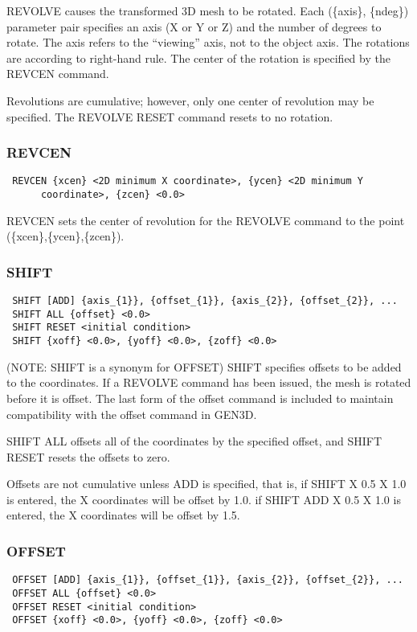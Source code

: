 REVOLVE causes the transformed 3D mesh to be rotated.  Each (\{axis\},
\{ndeg\}) parameter pair specifies an axis (X or Y or Z) and the number of
degrees to rotate.  The axis refers to the ``viewing'' axis, not to the
object axis.  The rotations are according to right-hand rule.  The
center of the rotation is specified by the REVCEN command.

Revolutions are cumulative; however, only one center of revolution may
be specified.  The REVOLVE RESET command resets to no rotation.
\subsubsection{REVCEN}
\begin{verbatim}
 REVCEN {xcen} <2D minimum X coordinate>, {ycen} <2D minimum Y
      coordinate>, {zcen} <0.0>
\end{verbatim}

REVCEN sets the center of revolution for the REVOLVE command to the
point (\{xcen\},\{ycen\},\{zcen\}).
\subsubsection{SHIFT}
\begin{verbatim}
 SHIFT [ADD] {axis_{1}}, {offset_{1}}, {axis_{2}}, {offset_{2}}, ... 
 SHIFT ALL {offset} <0.0> 
 SHIFT RESET <initial condition> 
 SHIFT {xoff} <0.0>, {yoff} <0.0>, {zoff} <0.0>
\end{verbatim}

(NOTE: SHIFT is a synonym for OFFSET)
SHIFT specifies offsets to be added to the coordinates.  If a REVOLVE
command has been issued, the mesh is rotated before it is offset.  The
last form of the offset command is included to maintain compatibility
with the offset command in GEN3D.

SHIFT ALL offsets all of the coordinates by the specified offset, and
SHIFT RESET resets the offsets to zero.

Offsets are not cumulative unless ADD is specified, that is, 
if SHIFT X 0.5 X 1.0 is entered, the X coordinates will be offset by 1.0.
if SHIFT ADD X 0.5 X 1.0 is entered, the X coordinates will be offset by 1.5.
\subsubsection{OFFSET}
\begin{verbatim}
 OFFSET [ADD] {axis_{1}}, {offset_{1}}, {axis_{2}}, {offset_{2}}, ... 
 OFFSET ALL {offset} <0.0> 
 OFFSET RESET <initial condition> 
 OFFSET {xoff} <0.0>, {yoff} <0.0>, {zoff} <0.0>
\end{verbatim}

